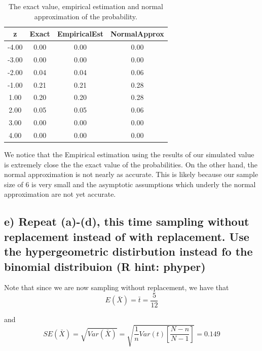 \documentclass[11pt]{article}
\begin{document}
\begin{table}[H]
\centering
\begin{tabular}{|c|ccc|}
  \hline
z & Exact & EmpiricalEst & NormalApprox \\ 
  \hline
-4.00 & 0.00 & 0.00 & 0.00 \\ 
  -3.00 & 0.00 & 0.00 & 0.00 \\ 
  -2.00 & 0.04 & 0.04 & 0.06 \\ 
  -1.00 & 0.21 & 0.21 & 0.28 \\ 
  1.00 & 0.20 & 0.20 & 0.28 \\ 
  2.00 & 0.05 & 0.05 & 0.06 \\ 
  3.00 & 0.00 & 0.00 & 0.00 \\ 
  4.00 & 0.00 & 0.00 & 0.00 \\ 
   \hline
\end{tabular}
\caption{The exact value, empirical estimation and normal approximation of the probability.} 
\end{table}

\noindent We notice that the Empirical estimation using the results of our simulated value is extremely close the the exact value of the probabilities. On the other hand, the normal approximation is not nearly as accurate. This is likely because our sample size of 6 is very small and the asymptotic assumptions which underly the normal approximation are not yet accurate.



\subsection*{e) Repeat (a)-(d), this time sampling without replacement instead of with replacement. Use the hypergeometric distirbution instead fo the binomial distribuion (R hint: phyper)}


\noindent Note that since we are now sampling without replacement, we have that
$$E(\bar{X}) = \bar{t} = \frac{5}{12}$$

\noindent and
$$SE(\bar{X}) = \sqrt{Var(\bar{X})} = \sqrt{\frac{1}{n} Var(t) \left[\frac{N - n}{N - 1}\right]} = 0.149$$
\end{document}
